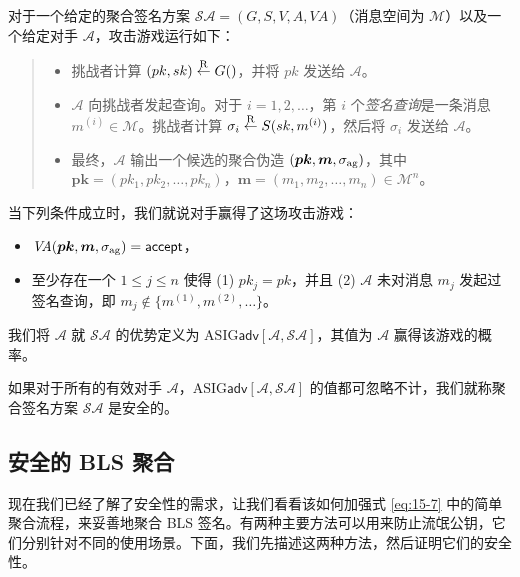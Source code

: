 \begin{game}[聚合签名的安全性]\label{game:15-2}
对于一个给定的聚合签名方案 $\mathcal{SA}=(G,S,V,A,\textit{VA})$（消息空间为 $\mathcal{M}$）以及一个给定对手 $\mathcal{A}$，攻击游戏运行如下：
\begin{quote}
\begin{itemize}
	\item 挑战者计算 $(pk,sk)\overset{\rm R}\leftarrow G()$，并将 $pk$ 发送给 $\mathcal{A}$。
	\item $\mathcal{A}$ 向挑战者发起查询。对于 $i=1,2,\dots$，第 $i$ 个\emph{签名查询}是一条消息 $m^{(i)}\in\mathcal{M}$。挑战者计算 $\sigma_{i}\overset{\rm R}\leftarrow S(sk,m^{(i)})$，然后将 $\sigma_i$ 发送给 $\mathcal{A}$。
	\item 最终，$\mathcal{A}$ 输出一个候选的聚合伪造 $(\boldsymbol{pk},\boldsymbol{m},\sigma_{\rm ag})$，其中 $\boldsymbol{pk}=(pk_1, pk_2, \dots, pk_n)$，$\boldsymbol{m}=(m_1,m_2,\dots,m_n)\in\mathcal{M}^n$。
\end{itemize}
\end{quote}
当下列条件成立时，我们就说对手赢得了这场攻击游戏：
\begin{itemize}
	\item $\textit{VA}(\boldsymbol{pk},\boldsymbol{m},\sigma_{\rm ag})=\mathsf{accept}$，
	\item 至少存在一个 $1\leq j\leq n$ 使得 (1) $pk_j=pk$，并且 (2) $\mathcal{A}$ 未对消息 $m_j$ 发起过签名查询，即 $m_j\notin\{m^{(1)},m^{(2)},\dots\}$。
\end{itemize}
我们将 $\mathcal{A}$ 就 $\mathcal{SA}$ 的优势定义为 $\mathrm{ASIG}\mathsf{adv}[\mathcal{A},\mathcal{SA}]$，其值为 $\mathcal{A}$ 赢得该游戏的概率。
\end{game}

\begin{definition}\label{def:15-5}
如果对于所有的有效对手 $\mathcal{A}$，$\mathrm{ASIG}\mathsf{adv}[\mathcal{A},\mathcal{SA}]$ 的值都可忽略不计，我们就称聚合签名方案 $\mathcal{SA}$ 是安全的。
\end{definition}


\subsection{安全的 BLS 聚合}\label{subsec:15-5-3}

现在我们已经了解了安全性的需求，让我们看看该如何加强式 \ref{eq:15-7} 中的简单聚合流程，来妥善地聚合 BLS 签名。有两种主要方法可以用来防止流氓公钥，它们分别针对不同的使用场景。下面，我们先描述这两种方法，然后证明它们的安全性。

